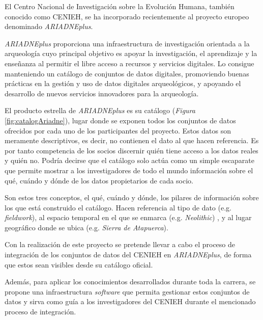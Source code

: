 
El Centro Nacional de Investigación sobre la Evolución Humana, también
conocido como CENIEH, se ha incorporado recientemente al proyecto
europeo denominado \emph{ARIADNEplus}. 

\emph{ARIADNEplus} proporciona una infraestructura de investigación orientada a la arqueología cuyo
principal objetivo es apoyar la investigación, el aprendizaje y la
enseñanza al permitir el libre acceso a recursos y servicios digitales.
Lo consigue manteniendo un catálogo de conjuntos de datos digitales, 
promoviendo buenas prácticas en la gestión y uso de datos digitales 
arqueológicos, y apoyando el desarrollo de nuevos servicios innovadores para la arqueología.


El producto estrella de \emph{ARIADNEplus} es su catálogo (\emph{Figura} \ref{fig:catalogAriadne}), lugar donde se exponen
todos los conjuntos de datos ofrecidos por cada uno de los participantes del proyecto.
Estos datos son meramente descriptivos, es decir, no contienen el dato al que hacen
referencia. Es por tanto competencia de los socios discernir quién tiene
acceso a los datos reales y quién no. Podría decirse que el catálogo
solo actúa como un simple escaparate que permite mostrar a los
investigadores de todo el mundo información sobre el qué, cuándo y dónde
de los datos propietarios de cada socio.


Son estos tres conceptos, el qué, cuándo y dónde, los pilares de
información sobre los que está construido el catálogo. Hacen referencia
al tipo de dato (e.g. \emph{fieldwork}), al espacio temporal en el que
se enmarca (e.g. \emph{Neolithic}) , y al lugar geográfico donde se
ubica (e.g. \emph{Sierra de Atapuerca}).

Con la realización de este proyecto se pretende llevar a cabo el proceso
de integración de los conjuntos de datos del CENIEH en
\emph{ARIADNEplus}, de forma que estos sean visibles desde su catálogo
oficial.

Además, para aplicar los conocimientos desarrollados durante toda la
carrera, se propone una infraestructura \emph{software} que permita
gestionar estos conjuntos de datos y sirva como guía a los
investigadores del CENIEH durante el mencionado proceso de integración.


